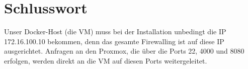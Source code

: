 \documentclass[
  letterpaper,
  DIV=11]{scrreprt}
\begin{document}
\section{Schlusswort}\label{schlusswort}

Unser Docker-Host (die VM) muss bei der Installation unbedingt die IP
172.16.100.10 bekommen, denn das gesamte Firewalling ist auf diese IP
ausgerichtet. Anfragen an den Proxmox, die über die Ports 22, 4000 und
8080 erfolgen, werden direkt an die VM auf diesen Ports weitergeleitet.
\end{document}
